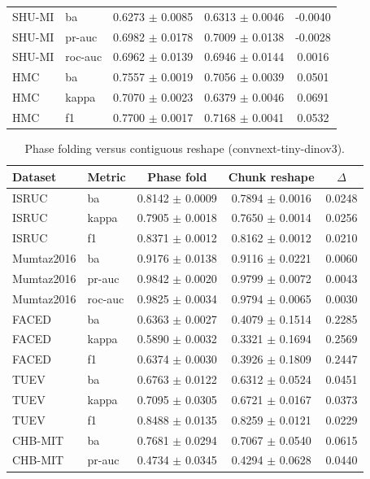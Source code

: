 \begin{table}[tbp]
\begin{tabular}{@{}l l c c c@{}}
SHU-MI & ba & 0.6273 $\pm$ 0.0085 & 0.6313 $\pm$ 0.0046 & -0.0040 \\
SHU-MI & pr-auc & 0.6982 $\pm$ 0.0178 & 0.7009 $\pm$ 0.0138 & -0.0028 \\
SHU-MI & roc-auc & 0.6962 $\pm$ 0.0139 & 0.6946 $\pm$ 0.0144 & 0.0016 \\
HMC & ba & 0.7557 $\pm$ 0.0019 & 0.7056 $\pm$ 0.0039 & 0.0501 \\
HMC & kappa & 0.7070 $\pm$ 0.0023 & 0.6379 $\pm$ 0.0046 & 0.0691 \\
HMC & f1 & 0.7700 $\pm$ 0.0017 & 0.7168 $\pm$ 0.0041 & 0.0532 \\
\bottomrule\end{tabular}\end{table}

\begin{table}[tbp]\centering\scriptsize\caption{Phase folding versus contiguous reshape (convnext-tiny-dinov3).}\begin{tabular}{@{}l l c c c@{}}\toprule Dataset & Metric & Phase fold & Chunk reshape & $\Delta$ \\ \midrule
ISRUC & ba & 0.8142 $\pm$ 0.0009 & 0.7894 $\pm$ 0.0016 & 0.0248 \\
ISRUC & kappa & 0.7905 $\pm$ 0.0018 & 0.7650 $\pm$ 0.0014 & 0.0256 \\
ISRUC & f1 & 0.8371 $\pm$ 0.0012 & 0.8162 $\pm$ 0.0012 & 0.0210 \\
Mumtaz2016 & ba & 0.9176 $\pm$ 0.0138 & 0.9116 $\pm$ 0.0221 & 0.0060 \\
Mumtaz2016 & pr-auc & 0.9842 $\pm$ 0.0020 & 0.9799 $\pm$ 0.0072 & 0.0043 \\
Mumtaz2016 & roc-auc & 0.9825 $\pm$ 0.0034 & 0.9794 $\pm$ 0.0065 & 0.0030 \\
FACED & ba & 0.6363 $\pm$ 0.0027 & 0.4079 $\pm$ 0.1514 & 0.2285 \\
FACED & kappa & 0.5890 $\pm$ 0.0032 & 0.3321 $\pm$ 0.1694 & 0.2569 \\
FACED & f1 & 0.6374 $\pm$ 0.0030 & 0.3926 $\pm$ 0.1809 & 0.2447 \\
TUEV & ba & 0.6763 $\pm$ 0.0122 & 0.6312 $\pm$ 0.0524 & 0.0451 \\
TUEV & kappa & 0.7095 $\pm$ 0.0305 & 0.6721 $\pm$ 0.0167 & 0.0373 \\
TUEV & f1 & 0.8488 $\pm$ 0.0135 & 0.8259 $\pm$ 0.0121 & 0.0229 \\
CHB-MIT & ba & 0.7681 $\pm$ 0.0294 & 0.7067 $\pm$ 0.0540 & 0.0615 \\
CHB-MIT & pr-auc & 0.4734 $\pm$ 0.0345 & 0.4294 $\pm$ 0.0628 & 0.0440 \\

\end{tabular}
\end{table}
